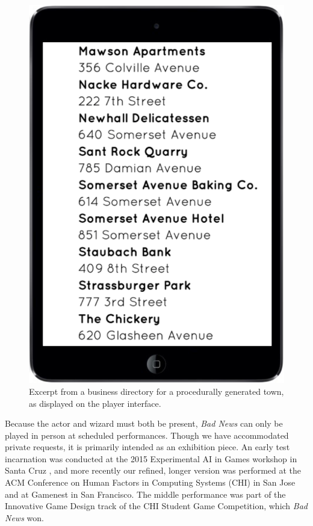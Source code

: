 \documentclass[letterpaper]{article}
\begin{document}
\begin{figure}[t]
  \centering
  \includegraphics[width=0.42\columnwidth]{images/bad_news-player_interface}
  \caption{Excerpt from a business directory for a procedurally generated town, as displayed on the player interface.}
  \label{fig:bn-player_interface}
\end{figure}

Because the actor and wizard must both be present, \textit{Bad News} can only be played in person at scheduled performances. Though we have accommodated private requests, it is primarily intended as an exhibition piece. An early test incarnation was conducted at the 2015 Experimental AI in Games workshop in Santa Cruz \cite{ryan2015bad}, and more recently our refined, longer version was performed at the ACM Conference on Human Factors in Computing Systems (CHI) in San Jose \cite{ryan2016bad} and at Gamenest in San Francisco. The middle performance was part of the Innovative Game Design track of the CHI Student Game Competition, which \textit{Bad News} won.









\end{document}
